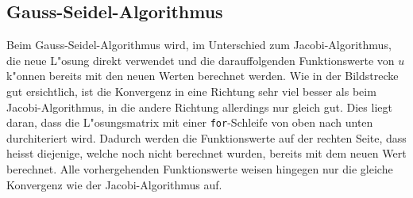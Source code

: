 \begin{refsection}
\subsection{Gauss-Seidel-Algorithmus}
Beim Gauss-Seidel-Algorithmus wird, im Unterschied zum
Jacobi-Algorithmus, die neue L"osung direkt verwendet und die
darauffolgenden Funktionswerte von $u$ k"onnen bereits mit
den neuen Werten berechnet werden. Wie in der Bildstrecke gut
ersichtlich, ist die Konvergenz in eine Richtung sehr viel besser
als beim Jacobi-Algorithmus, in die andere Richtung allerdings
nur gleich gut. Dies liegt daran, dass die L"osungsmatrix mit
einer \texttt{for}-Schleife von oben nach unten durchiteriert
wird. Dadurch werden die Funktionswerte auf der rechten Seite,
dass heisst diejenige, welche noch nicht berechnet wurden,
bereits mit dem neuen Wert berechnet. Alle vorhergehenden
Funktionswerte weisen hingegen nur die gleiche Konvergenz wie
der Jacobi-Algorithmus auf. 
	
\begin{figure}
\centering 
{}\quad 
{}\quad 
{} 


\end{figure}
\end{refsection}
